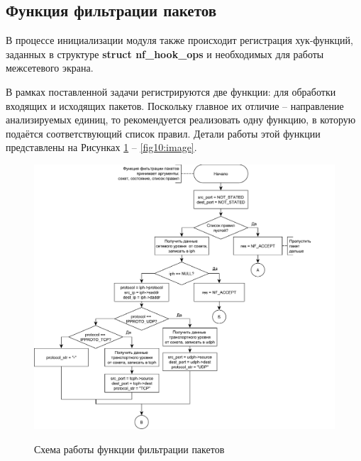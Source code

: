 \pagebreak

\subsection{Функция фильтрации пакетов}
В процессе инициализации модуля также происходит регистрация хук-функций, заданных в структуре \textbf{struct nf\_hook\_ops} и необходимых для работы межсетевого экрана. 

В рамках поставленной задачи регистрируются две функции: для обработки входящих и исходящих пакетов. Поскольку главное их отличие -- направление анализируемых единиц, то рекомендуется реализовать одну функцию, в которую подаётся соответствующий список правил. Детали работы этой функции представлены на Рисунках \ref{fig9:image} -- \ref{fig10:image}.

\begin{figure}[h!]
	\begin{center}
		{\includegraphics[scale = 0.55]{img/filter1.pdf}}
		\caption{Схема работы функции фильтрации пакетов}
		\label{fig9:image}
	\end{center}
\end{figure}

